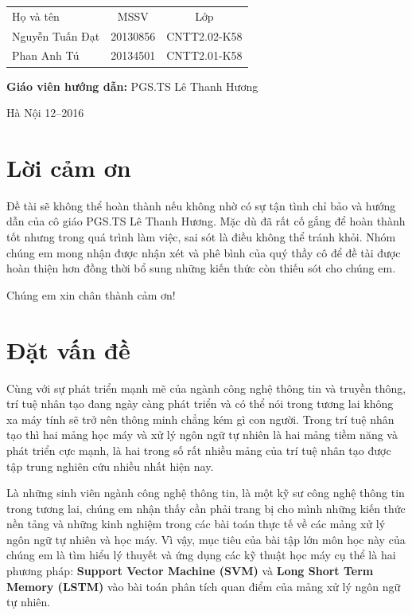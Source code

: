 \documentclass[a4paper,12pt]{report}
\renewcommand{\contentsname}{Mục lục}
\begin{document}
\begin{longtable}{l c c}

Họ và tên & MSSV  & Lớp\\

Nguyễn Tuấn Đạt & 20130856 & CNTT2.02-K58 \\
Phan Anh Tú &   20134501 & CNTT2.01-K58\\

\end{longtable}

\hspace{1cm}\fontsize{14}{16}\selectfont \textbf{Giáo viên hướng dẫn: }PGS.TS Lê Thanh Hương \\[2cm]
\begin{center}
\fontsize{16}{19}\selectfont Hà Nội 12--2016

\end{center}
\newpage
\pdfbookmark{\contentsname}{toc}
\tableofcontents
\listoffigures

\chapter*{Lời cảm ơn}
{}
Đề tài sẽ không thể hoàn thành nếu không nhờ có sự tận tình chỉ bảo và hướng dẫn của cô giáo PGS.TS Lê Thanh Hương. Mặc dù đã rất cố gắng để hoàn thành tốt nhưng trong quá trình làm việc, sai sót là điều không thể tránh khỏi. Nhóm chúng em mong nhận được nhận xét và phê bình của quý thầy cô để đề tài được hoàn thiện hơn đồng thời bổ sung những kiến thức còn thiếu sót cho chúng em.


Chúng em xin chân thành cảm ơn!

\chapter{Đặt vấn đề }
Cùng với sự phát triển mạnh mẽ của ngành công nghệ thông tin và truyền thông, trí tuệ nhân tạo đang ngày càng phát triển và có thể nói trong tương lai không xa máy tính sẽ trở nên thông minh chẳng kém gì con người. Trong trí tuệ nhân tạo thì hai mảng học máy và xử lý ngôn ngữ tự nhiên là hai mảng tiềm năng và phát triển cực mạnh, là hai trong số rất nhiều mảng của trí tuệ nhân tạo được tập trung nghiên cứu nhiều nhất hiện nay.


Là những sinh viên ngành công nghệ thông tin, là một kỹ sư công nghệ thông tin trong tương lai, chúng em nhận thấy cần phải trang bị cho mình những kiến thức nền tảng và những kinh nghiệm trong các bài toán thực tế về các mảng xử lý ngôn ngữ tự nhiên và học máy. Vì vậy, mục tiêu của bài tập lớn môn học này của chúng em là tìm hiểu lý thuyết và ứng dụng các kỹ thuật học máy cụ thể là hai phương pháp: \textbf{Support Vector Machine (SVM)} và \textbf{Long Short Term Memory (LSTM)} vào bài toán phân tích quan điểm của mảng xử lý ngôn ngữ tự nhiên.
\end{document}
